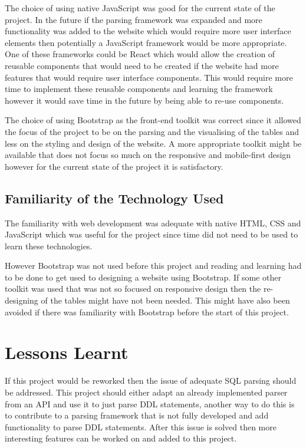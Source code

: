 The choice of using native JavaScript was good for the current state of the project. In the future if the parsing framework was expanded and more functionality was added to the website which would require more user interface elements then potentially a JavaScript framework would be more appropriate. One of these frameworks could be React which would allow the creation of reusable components that would need to be created if the website had more features that would require user interface components. This would require more time to implement these reusable components and learning the framework however it would save time in the future by being able to re-use components. 

The choice of using Bootstrap as the front-end toolkit was correct since it allowed the focus of the project to be on the parsing and the visualising of the tables and less on the styling and design of the website. A more appropriate toolkit might be available that does not focus so much on the responsive and mobile-first design however for the current state of the project it is satisfactory. 

\subsection{Familiarity of the Technology Used}

The familiarity with web development was adequate with native HTML, CSS and JavaScript which was useful for the project since time did not need to be used to learn these technologies. 

However Bootstrap was not used before this project and reading and learning had to be done to get used to designing a website using Bootstrap. If some other toolkit was used that was not so focused on responsive design then the re-designing of the tables might have not been needed. This might have also been avoided if there was familiarity with Bootstrap before the start of this project. 


\section{Lessons Learnt}

If this project would be reworked then the issue of adequate SQL parsing should be addressed. This project should either adapt an already implemented parser from an API and use it to just parse DDL statements, another way to do this is to contribute to a parsing framework that is not fully developed and add functionality to parse DDL statements. After this issue is solved then more interesting features can be worked on and added to this project.

